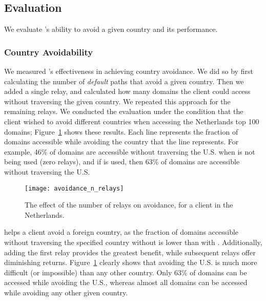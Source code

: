 \subsection{Evaluation}

We evaluate \system{}'s ability to avoid a given country and its performance.

\subsubsection{Country Avoidability}

We measured \system{}'s effectiveness in achieving country avoidance.  We did so by first 
calculating the number of {\it default} paths that avoid a given country.  Then 
we added a single relay, and calculated how many domains the client could 
access without traversing the given country.  We repeated this approach for 
the remaining relays.  We conducted the evaluation under the condition that 
the client wished to avoid different countries when accessing the Netherlands top 
100 domains; Figure~\ref{fig:avoidance_eval} shows these results.  Each 
line represents the fraction of domains accessible while avoiding the country that 
the line represents.  For example, 46\% of domains are accessible without traversing 
the U.S. when \system{} is not being used (zero relays), and if \system{} is 
used, then 63\% of domains are accessible without traversing the U.S.

\begin{figure}[t]
\tiny
\centering
\texttt{[image: avoidance\_n\_relays]}
\caption{The effect of the number of relays on avoidance, for a client
  in the Netherlands.}
\label{fig:avoidance_eval}
\end{figure}

\system{} helps a client avoid a foreign country,
as the fraction of domains accessible without traversing the specified
country without \system{} is lower than with \system{}.  Additionally,
adding the first relay provides the greatest benefit, while subsequent
relays offer diminishing returns.  Figure~\ref{fig:avoidance_eval}
clearly shows that avoiding the U.S. is much more difficult (or
impossible) than any other country.  Only 63\% of domains can be
accessed while avoiding the U.S., whereas almost all domains can be
accessed while avoiding any other given country.

